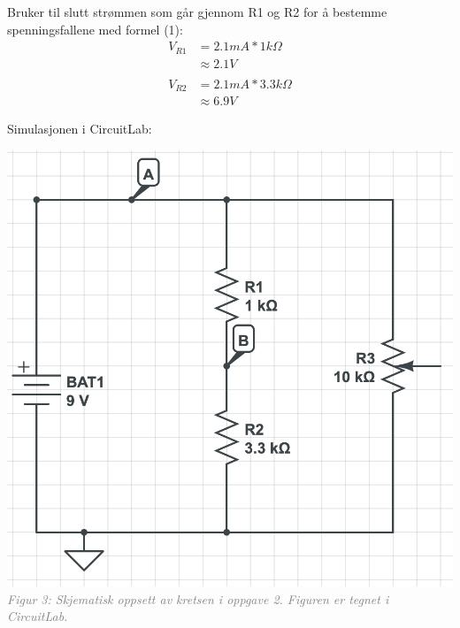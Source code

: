 \documentclass{article}
\begin{document}
            Bruker til slutt strømmen som går gjennom R1 og R2 for å bestemme spenningsfallene med formel (1):
                \begin{equation*}
                    \begin{split}
                        V_{R1} &= 2.1mA * 1k\Omega \\
                            &\approx 2.1V \\
                            \\
                        V_{R2} &= 2.1mA * 3.3k\Omega \\
                            &\approx 6.9V
                    \end{split}
                \end{equation*}

            Simulasjonen i CircuitLab:
            \begin{center}
                \includegraphics[scale=0.5]{vedlegg/2.png}\linebreak
                \textit{\textcolor{gray}{Figur 3: Skjematisk oppsett av kretsen i oppgave 2. Figuren er tegnet i CircuitLab.}}
            \end{center}
            
\end{document}
